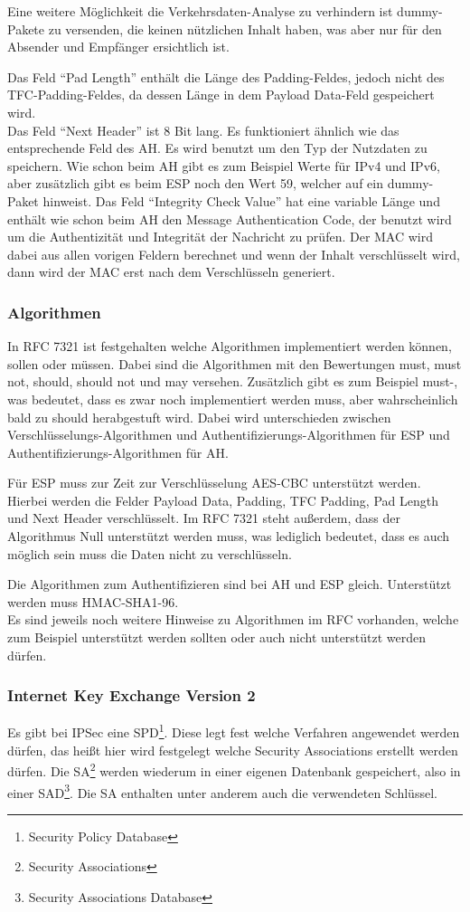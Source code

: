 \documentclass[12pt]{scrartcl}
\begin{document}
Eine weitere Möglichkeit die Verkehrsdaten-Analyse zu verhindern ist dummy-Pakete zu versenden, die keinen nützlichen Inhalt haben, was aber nur für den Absender und Empfänger ersichtlich ist.

Das Feld "`Pad Length"' enthält die Länge des Padding-Feldes, jedoch nicht des TFC-Padding-Feldes, da dessen Länge in dem Payload Data-Feld gespeichert wird.\\
Das Feld "`Next Header"' ist 8 Bit lang. Es funktioniert ähnlich wie das entsprechende Feld des AH. Es wird benutzt um den Typ der Nutzdaten zu speichern. Wie schon beim AH gibt es zum Beispiel Werte für IPv4 und IPv6, aber zusätzlich gibt es beim ESP noch den Wert 59, welcher auf ein dummy-Paket hinweist. Das Feld "`Integrity Check Value"' hat eine variable Länge und enthält wie schon beim AH den Message Authentication Code, der benutzt wird um die Authentizität und Integrität der Nachricht zu prüfen. Der MAC wird dabei aus allen vorigen Feldern berechnet und wenn der Inhalt verschlüsselt wird, dann wird der MAC erst nach dem Verschlüsseln generiert. 

\subsubsection{Algorithmen}
In RFC 7321 ist festgehalten welche Algorithmen implementiert werden können, sollen oder müssen.\cite{RFC7321} Dabei sind die Algorithmen mit den Bewertungen must, must not, should, should not und may versehen. Zusätzlich gibt es zum Beispiel must-, was bedeutet, dass es zwar noch implementiert werden muss, aber wahrscheinlich bald zu should herabgestuft wird. Dabei wird unterschieden zwischen Verschlüsselungs-Algorithmen und Authentifizierungs-Algorithmen für ESP und Authentifizierungs-Algorithmen für AH.

Für ESP muss zur Zeit zur Verschlüsselung AES-CBC unterstützt werden. Hierbei werden die Felder Payload Data, Padding, TFC Padding, Pad Length und Next Header verschlüsselt. Im RFC 7321 steht außerdem, dass der Algorithmus Null unterstützt werden muss, was lediglich bedeutet, dass es auch möglich sein muss die Daten nicht zu verschlüsseln.

Die Algorithmen zum Authentifizieren sind bei AH und ESP gleich. Unterstützt werden muss HMAC-SHA1-96.\\
Es sind jeweils noch weitere Hinweise zu Algorithmen im RFC vorhanden, welche zum Beispiel unterstützt werden sollten oder auch nicht unterstützt werden dürfen. 
\subsubsection{Internet Key Exchange Version 2}
Es gibt bei IPSec eine SPD\footnote{Security Policy Database}. Diese legt fest welche Verfahren angewendet werden dürfen, das heißt hier wird festgelegt welche Security Associations erstellt werden dürfen. Die SA\footnote{Security Associations} werden wiederum in einer eigenen Datenbank gespeichert, also in einer SAD\footnote{Security Associations Database}. Die SA enthalten unter anderem auch die verwendeten Schlüssel.
\end{document}
